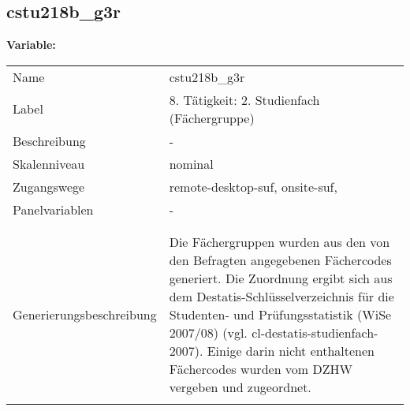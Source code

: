 	
	
	\subsection{cstu218b\_g3r}
	\label{subSection:cstu218b_g3r}

	\noindent\textbf{Variable:}\\
		\begin{tabular}{lL{11.3cm}}
			\label{tableVariable:cstu218b_g3r}
			Name & cstu218b\_g3r \\
			Label & 8. Tätigkeit: 2. Studienfach (Fächergruppe) \\
			Beschreibung & - \\
			Skalenniveau & nominal \\
			Zugangswege &
				remote-desktop-suf,
				onsite-suf,
 \\
			Panelvariablen & -
			 \\
			 \\
 \\
					Generierungsbeschreibung & Die Fächergruppen wurden aus den von den Befragten angegebenen Fächercodes generiert. Die Zuordnung ergibt sich aus dem Destatis-Schlüsselverzeichnis für die Studenten- und Prüfungsstatistik (WiSe 2007/08) (vgl. cl-destatis-studienfach-2007).  Einige darin nicht enthaltenen Fächercodes wurden vom DZHW vergeben und zugeordnet. 
				 \\	
			 \\
		\end{tabular}






